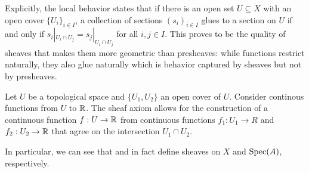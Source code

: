 Explicitly, the local behavior states that if there is an open set $U\subseteq X$ with an open cover $\{U_{i}\}_{i\in I}$, a collection of sections $(s_{i})_{i\in I}$ glues to a section on $U$ if and only if $s_{i}|_{U_{i}\cap U_{j}}=s_{j}|_{U_{i}\cap U_{j}}$ for all $i,j\in I$. This proves to be the quality of sheaves that makes them more geometric than presheaves: while functions restrict naturally, they also glue naturally which is behavior captured by sheaves but not by presheaves. 
\begin{example}
    Let $U$ be a topological space and $\{U_{1},U_{2}\}$ an open cover of $U$. Consider continous functions from $U$ to $\mathbb{R}$. The sheaf axiom allows for the construction of a continuous function $f:U\to \mathbb{R}$ from continuous functions $f_{1}:U_{1}\to R$ and $f_{2}:U_{2}\to\mathbb{R}$ that agree on the intersection $U_{1}\cap U_{2}$. 
\end{example}
In particular, we can see that  and  in fact define sheaves on $X$ and $\operatorname{Spec}(A)$, respectively. 